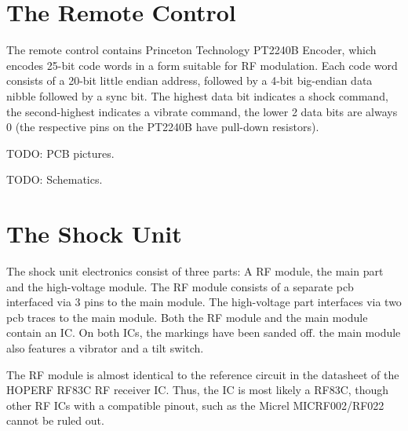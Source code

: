 \documentclass[a4paper]{article}
\begin{document}
\section{The Remote Control}

The remote control contains Princeton Technology PT2240B Encoder, which encodes 25-bit code words in a form suitable for RF modulation. Each code word consists of a 20-bit little endian address, followed by a 4-bit big-endian data nibble followed by a sync bit. The highest data bit indicates a shock command, the second-highest indicates a vibrate command, the lower 2 data bits are always 0 (the respective pins on the PT2240B have pull-down resistors).

TODO: PCB pictures.

TODO: Schematics.

\section{The Shock Unit}

The shock unit electronics consist of three parts: A RF module, the main part and the high-voltage module. The RF module consists of a separate pcb interfaced via 3 pins to the main module. The high-voltage part interfaces via two pcb traces to the main module. Both the RF module and the main module contain an IC. On both ICs, the markings have been sanded off. the main module also features a vibrator and a tilt switch.

The RF module is almost identical to the reference circuit in the datasheet of the HOPERF RF83C RF receiver IC. Thus, the IC is most likely a RF83C, though other RF ICs with a compatible pinout, such as the Micrel MICRF002/RF022 cannot be ruled out.
\end{document}
